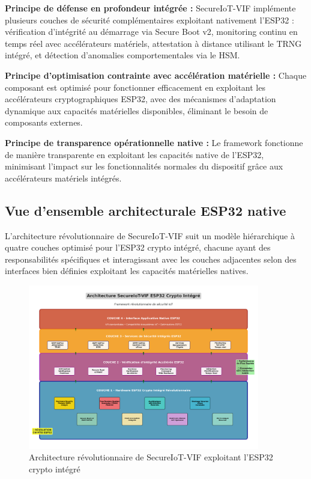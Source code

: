 \textbf{Principe de défense en profondeur intégrée :} SecureIoT-VIF implémente plusieurs couches de sécurité complémentaires exploitant nativement l'ESP32 : vérification d'intégrité au démarrage via Secure Boot v2, monitoring continu en temps réel avec accélérateurs matériels, attestation à distance utilisant le TRNG intégré, et détection d'anomalies comportementales via le HSM.

\textbf{Principe d'optimisation contrainte avec accélération matérielle :} Chaque composant est optimisé pour fonctionner efficacement en exploitant les accélérateurs cryptographiques ESP32, avec des mécanismes d'adaptation dynamique aux capacités matérielles disponibles, éliminant le besoin de composants externes.

\textbf{Principe de transparence opérationnelle native :} Le framework fonctionne de manière transparente en exploitant les capacités native de l'ESP32, minimisant l'impact sur les fonctionnalités normales du dispositif grâce aux accélérateurs matériels intégrés.

\subsection{Vue d'ensemble architecturale ESP32 native}

L'architecture révolutionnaire de SecureIoT-VIF suit un modèle hiérarchique à quatre couches optimisé pour l'ESP32 crypto intégré, chacune ayant des responsabilités spécifiques et interagissant avec les couches adjacentes selon des interfaces bien définies exploitant les capacités matérielles natives.

\begin{figure}[h]
    \centering
    \includegraphics[width=0.9\textwidth]{assets/figures/secureiot_architecture_esp32.png}
    \caption{Architecture révolutionnaire de SecureIoT-VIF exploitant l'ESP32 crypto intégré}
    \label{fig:secureiot-architecture-esp32}
\end{figure}


